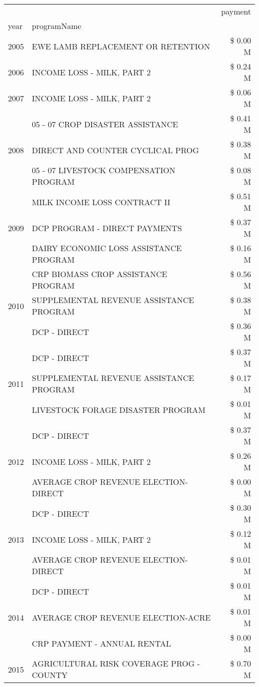 \begin{tabular}{llr}
\toprule
 &  & payment \\
year & programName &  \\
\midrule
2005 & EWE LAMB REPLACEMENT OR RETENTION & \$ 0.00 M \\
\cline{1-3}
2006 & INCOME LOSS - MILK, PART 2 & \$ 0.24 M \\
\cline{1-3}
2007 & INCOME LOSS - MILK, PART 2 & \$ 0.06 M \\
\cline{1-3}
\multirow[t]{3}{*}{2008} & 05 - 07 CROP DISASTER ASSISTANCE & \$ 0.41 M \\
 & DIRECT AND COUNTER CYCLICAL PROG & \$ 0.38 M \\
 & 05 - 07 LIVESTOCK COMPENSATION PROGRAM & \$ 0.08 M \\
\cline{1-3}
\multirow[t]{3}{*}{2009} & MILK INCOME LOSS CONTRACT II & \$ 0.51 M \\
 & DCP PROGRAM - DIRECT PAYMENTS & \$ 0.37 M \\
 & DAIRY ECONOMIC LOSS ASSISTANCE PROGRAM & \$ 0.16 M \\
\cline{1-3}
\multirow[t]{3}{*}{2010} & CRP BIOMASS CROP ASSISTANCE PROGRAM & \$ 0.56 M \\
 & SUPPLEMENTAL REVENUE ASSISTANCE PROGRAM & \$ 0.38 M \\
 & DCP - DIRECT & \$ 0.36 M \\
\cline{1-3}
\multirow[t]{3}{*}{2011} & DCP - DIRECT & \$ 0.37 M \\
 & SUPPLEMENTAL REVENUE ASSISTANCE PROGRAM & \$ 0.17 M \\
 & LIVESTOCK FORAGE DISASTER PROGRAM & \$ 0.01 M \\
\cline{1-3}
\multirow[t]{3}{*}{2012} & DCP - DIRECT & \$ 0.37 M \\
 & INCOME LOSS - MILK, PART 2 & \$ 0.26 M \\
 & AVERAGE CROP REVENUE ELECTION-DIRECT & \$ 0.00 M \\
\cline{1-3}
\multirow[t]{3}{*}{2013} & DCP - DIRECT & \$ 0.30 M \\
 & INCOME LOSS - MILK, PART 2 & \$ 0.12 M \\
 & AVERAGE CROP REVENUE ELECTION-DIRECT & \$ 0.01 M \\
\cline{1-3}
\multirow[t]{3}{*}{2014} & DCP - DIRECT & \$ 0.01 M \\
 & AVERAGE CROP REVENUE ELECTION-ACRE & \$ 0.01 M \\
 & CRP PAYMENT - ANNUAL RENTAL & \$ 0.00 M \\
\cline{1-3}
\multirow[t]{2}{*}{2015} & AGRICULTURAL RISK COVERAGE PROG - COUNTY & \$ 0.70 M \\

\end{tabular}
